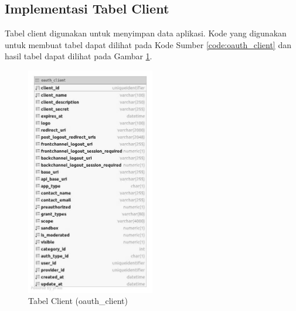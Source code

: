 \subsection{Implementasi Tabel Client}
\par Tabel client digunakan untuk menyimpan data aplikasi. Kode yang digunakan untuk membuat tabel dapat dilihat pada Kode Sumber \ref{code:oauth_client} dan hasil tabel dapat dilihat pada Gambar \ref{tabel_oauth_client}.

\begin{figure}[H]
    \centering\includegraphics[width=0.5\textwidth]{bab4/figures/tabel_oauth_client.jpg}
    \caption{Tabel Client (oauth\_client)}
    \label{tabel_oauth_client}
\end{figure}

